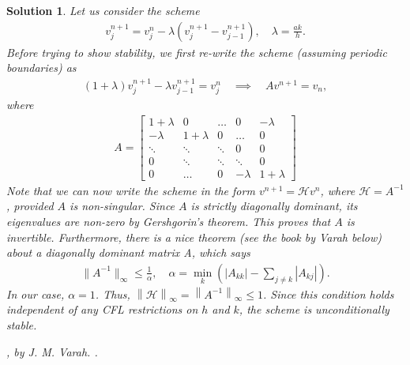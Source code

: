 \documentclass[10pt,letterpaper]{article}
\newcommand{\rb}[1]{ \left(  {#1} \right) }
\newcommand{\norm}[1]{ \left\|  {#1} \right\| }
\theoremstyle{break}
\newtheorem{solution}{Solution}
\begin{document}
\begin{solution}
	Let us consider the scheme
	\begin{gather} \label{implicit} 	
		v_j^{n+1}=v_j^n -\lambda \rb{v_{j}^{n+1} -v_{j-1}^{n+1}}, \quad \lambda = \frac{ak}{h}. 
	\end{gather} 
	Before trying to show stability, we first re-write the scheme (assuming periodic boundaries) as 
	\begin{gather} \label{implicit_1} 	
		\rb{1 + \lambda} v_{j}^{n+1} -\lambda v_{j-1}^{n+1} =v_j^n \quad \implies \quad A v^{n+1} = v_n,
	\end{gather} 
	where 
	\begin{gather}
	A = \begin{bmatrix}
	1+\lambda & 0 & \dots & 0 & -\lambda \\
	-\lambda & 1+\lambda & 0 & \dots & 0 \\
	\ddots & \ddots & \ddots & 0 & 0\\
	0 & \ddots & \ddots & \ddots & 0 \\
	0 & \dots & 0 & -\lambda & 1 + \lambda
	\end{bmatrix}
	\end{gather}
	Note that we can now write the scheme in the form $v^{n+1} = \mathcal{H} v^n$, where $\mathcal{H} = A^{-1}$, 
	provided $A$ is non-singular. Since $A$ is strictly diagonally dominant, its eigenvalues are non-zero by Gershgorin's theorem.
	This proves that $A$ is invertible. Furthermore, there is a nice theorem (see the book by Varah below) about a diagonally dominant matrix A,
	which says 
	\begin{gather}
	\|A^{-1}\|_\infty \leq \frac{1}{\alpha}, \quad \alpha = \min_k\left(|A_{kk}| - \sum_{j\neq k} |A_{kj}| \right).
	\end{gather}
	In our case, $\alpha = 1$. Thus, $\norm{\mathcal{H}}_\infty = \norm{A^{-1}}_\infty \leq 1$.
	Since this condition holds independent of any CFL restrictions on $h$ and $k$, the scheme is unconditionally stable.
	
	\begin{thebibliography}{----}

		, by J. M. Varah.
		.
		
	\end{thebibliography}
\end{solution}
\end{document}
